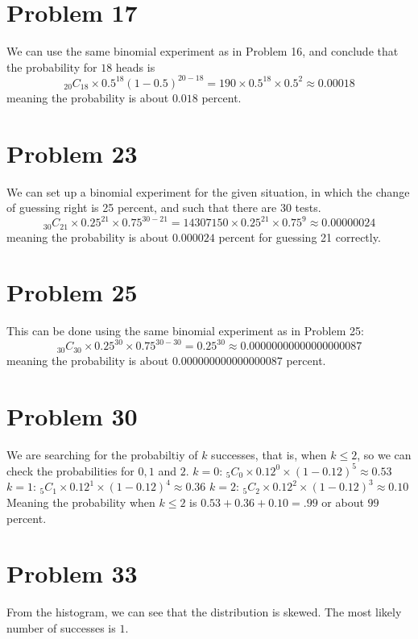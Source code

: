 \documentclass{article}
\theoremstyle{definition}
\newcommand{\?}{\stackrel{?}{=}}
\begin{document}
\section*{Problem 17}
We can use the same binomial experiment as in Problem 16, and conclude that the probability for $18$ heads is
\[ _{20}C_{18}\times 0.5^{18}\left(1-0.5\right)^{20-18}=190\times 0.5^{18}\times 0.5^{2}\approx 0.00018 \] meaning the probability is about 
$0.018$ percent.

\section*{Problem 23}
We can set up a binomial experiment for the given situation, in which the change of guessing right is 25 percent, and such that there are 30 tests.
\[ _{30}C_{21}\times 0.25^{21}\times 0.75^{30-21}=14307150\times 0.25^{21}\times 0.75^{9}\approx 0.00000024 \] meaning the probability is about 
$0.000024$ percent for guessing 21 correctly.

\section*{Problem 25}
This can be done using the same binomial experiment as in Problem 25:
\[ _{30}C_{30}\times 0.25^{30}\times 0.75^{30-30}=0.25^{30}\approx 0.00000000000000000087 \] meaning the probability is about
$0.000000000000000087$ percent.

\section*{Problem 30}
We are searching for the probabiltiy of $k$ successes, that is, when $k\le 2$, so we can check the probabilities for $0,1$ and $2$.\newline
$k=0$: $_5C_0\times 0.12^0\times (1-0.12)^5\approx 0.53$\newline
$k=1$: $_5C_1\times 0.12^1\times (1-0.12)^4\approx 0.36$\newline
$k=2$: $_5C_2\times 0.12^2\times (1-0.12)^3\approx 0.10$\newline
Meaning the probability when $k\le 2$ is $0.53+0.36+0.10=.99$ or about $99$ percent.

\section*{Problem 33}
\newline
From the histogram, we can see that the distribution is skewed. The most likely number of successes is $1$.
\end{document}

